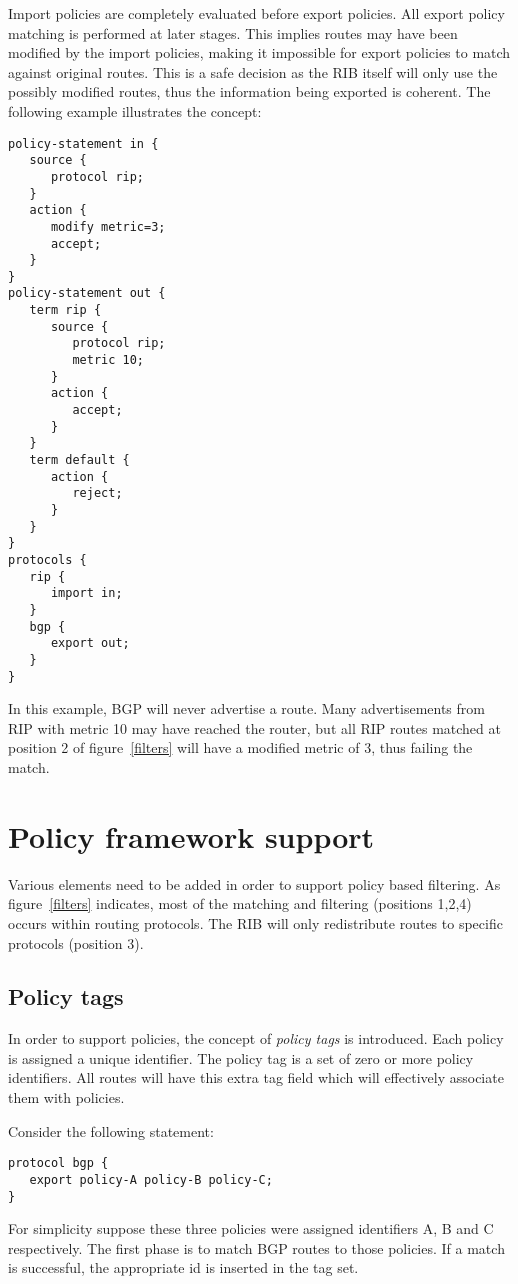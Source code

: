 \documentclass{article}
\begin{document}
Import policies are completely evaluated before export policies. All export
policy matching is performed at later stages. This implies routes may have been
modified by the import policies, making it impossible for export policies to
match against original routes. This is a safe decision as the RIB itself will
only use the possibly modified routes, thus the information being exported is
coherent. The following example illustrates the concept:
\begin{verbatim}
policy-statement in {
   source {
      protocol rip;
   }
   action {
      modify metric=3;
      accept;
   }
}
policy-statement out {
   term rip {
      source {
         protocol rip;
         metric 10;
      }
      action {
         accept;
      }
   }
   term default {
      action {
         reject;
      }
   }
}
protocols {
   rip {
      import in;
   }
   bgp {
      export out;
   }
}
\end{verbatim}
In this example, BGP will never advertise a route. Many advertisements from RIP
with metric 10 may have reached the router, but all RIP routes matched at
position 2 of figure~\ref{filters} will have a modified metric of 3, thus
failing the match.




\section{Policy framework support}
Various elements need to be added in order to support policy based filtering.
As figure~\ref{filters} indicates, most of the matching and filtering (positions
1,2,4) occurs within routing protocols. The RIB will only redistribute routes to
specific protocols (position 3).



\subsection{Policy tags}
In order to support policies, the concept of {\em policy tags} is introduced.
Each policy is assigned a unique identifier. The policy tag is a set of zero or
more policy identifiers. All routes will have this extra tag field which will
effectively associate them with policies.

Consider the following statement:
\begin{verbatim}
protocol bgp {
   export policy-A policy-B policy-C;
}
\end{verbatim}
For simplicity suppose these three policies were assigned identifiers A, B and C
respectively. The first phase is to match BGP routes to those policies. If a
match is successful, the appropriate id is inserted in the tag set. 
\end{document}
